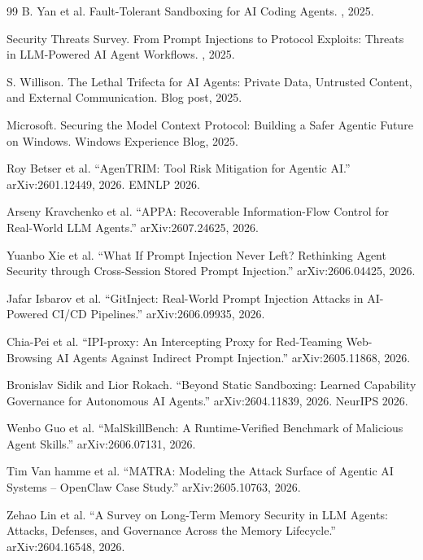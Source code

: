 \begin{thebibliography}{99}
B. Yan et al.
\newblock Fault-Tolerant Sandboxing for AI Coding Agents.
, 2025.

Security Threats Survey.
\newblock From Prompt Injections to Protocol Exploits: Threats in LLM-Powered AI Agent Workflows.
, 2025.

S. Willison.
\newblock The Lethal Trifecta for AI Agents: Private Data, Untrusted Content, and External Communication.
\newblock Blog post, 2025.

Microsoft.
\newblock Securing the Model Context Protocol: Building a Safer Agentic Future on Windows.
\newblock Windows Experience Blog, 2025.


Roy Betser et al.
``AgenTRIM: Tool Risk Mitigation for Agentic AI.''
arXiv:2601.12449, 2026. EMNLP 2026.

Arseny Kravchenko et al.
``APPA: Recoverable Information-Flow Control for Real-World LLM Agents.''
arXiv:2607.24625, 2026.

Yuanbo Xie et al.
``What If Prompt Injection Never Left? Rethinking Agent Security through Cross-Session Stored Prompt Injection.''
arXiv:2606.04425, 2026.

Jafar Isbarov et al.
``GitInject: Real-World Prompt Injection Attacks in AI-Powered CI/CD Pipelines.''
arXiv:2606.09935, 2026.

Chia-Pei et al.
``IPI-proxy: An Intercepting Proxy for Red-Teaming Web-Browsing AI Agents Against Indirect Prompt Injection.''
arXiv:2605.11868, 2026.

Bronislav Sidik and Lior Rokach.
``Beyond Static Sandboxing: Learned Capability Governance for Autonomous AI Agents.''
arXiv:2604.11839, 2026. NeurIPS 2026.

Wenbo Guo et al.
``MalSkillBench: A Runtime-Verified Benchmark of Malicious Agent Skills.''
arXiv:2606.07131, 2026.

Tim Van hamme et al.
``MATRA: Modeling the Attack Surface of Agentic AI Systems -- OpenClaw Case Study.''
arXiv:2605.10763, 2026.

Zehao Lin et al.
``A Survey on Long-Term Memory Security in LLM Agents: Attacks, Defenses, and Governance Across the Memory Lifecycle.''
arXiv:2604.16548, 2026.


\end{thebibliography}
